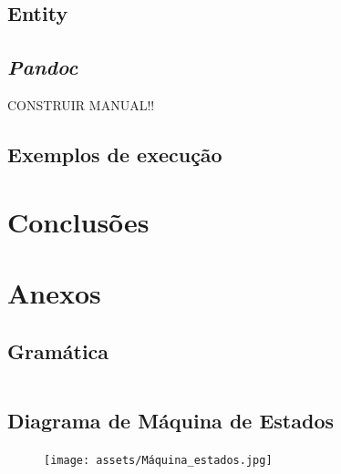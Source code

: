 \documentclass[11pt]{report}
\begin{document}
\section{Entity}
 \label{subsec:entity}

\section{\textit{Pandoc}}
CONSTRUIR MANUAL!!

\section{Exemplos de execução}

\chapter{Conclusões}



\chapter{Anexos}\label{sec:anexos}

\section{Gramática} \label{fig:grammar}
\inputminted{bash}{assets/gramatica.txt}

\section{Diagrama de Máquina de Estados}
\begin{figure}[!ht]
    \centering
    \texttt{[image: assets/Máquina\_estados.jpg]}
\end{figure}
\end{document}
